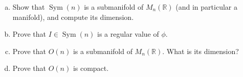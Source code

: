 \documentclass{article}
\newenvironment{problem}[2][Problem]{\begin{trivlist}
\item[\hskip \labelsep {\bfseries #1}\hskip \labelsep {\bfseries #2.}]}{\end{trivlist}}
\begin{document}
\pagebreak

\begin{problem}{6} $ $\\
  \begin{enumerate}[(a)]
    \item Show that $\operatorname{Sym}(n)$ is a submanifold of
    $M_n(\mathbb{R})$ (and in particular a manifold), and compute its dimension.
    \item Prove that $I \in \operatorname{Sym}(n)$ is a regular value of $\phi$.
    \item Prove that $O(n)$ is a submanifold of $M_n(\mathbb{R})$. What is its dimension?
    \item Prove that $O(n)$ is compact.
  \end{enumerate}
\end{problem}
\end{document}
